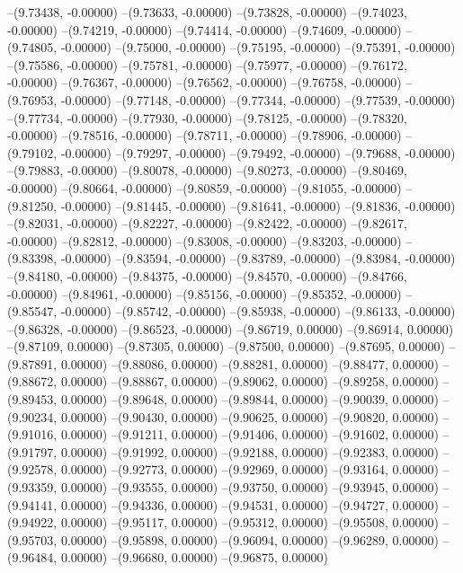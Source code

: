--(9.73438, -0.00000)
--(9.73633, -0.00000)
--(9.73828, -0.00000)
--(9.74023, -0.00000)
--(9.74219, -0.00000)
--(9.74414, -0.00000)
--(9.74609, -0.00000)
--(9.74805, -0.00000)
--(9.75000, -0.00000)
--(9.75195, -0.00000)
--(9.75391, -0.00000)
--(9.75586, -0.00000)
--(9.75781, -0.00000)
--(9.75977, -0.00000)
--(9.76172, -0.00000)
--(9.76367, -0.00000)
--(9.76562, -0.00000)
--(9.76758, -0.00000)
--(9.76953, -0.00000)
--(9.77148, -0.00000)
--(9.77344, -0.00000)
--(9.77539, -0.00000)
--(9.77734, -0.00000)
--(9.77930, -0.00000)
--(9.78125, -0.00000)
--(9.78320, -0.00000)
--(9.78516, -0.00000)
--(9.78711, -0.00000)
--(9.78906, -0.00000)
--(9.79102, -0.00000)
--(9.79297, -0.00000)
--(9.79492, -0.00000)
--(9.79688, -0.00000)
--(9.79883, -0.00000)
--(9.80078, -0.00000)
--(9.80273, -0.00000)
--(9.80469, -0.00000)
--(9.80664, -0.00000)
--(9.80859, -0.00000)
--(9.81055, -0.00000)
--(9.81250, -0.00000)
--(9.81445, -0.00000)
--(9.81641, -0.00000)
--(9.81836, -0.00000)
--(9.82031, -0.00000)
--(9.82227, -0.00000)
--(9.82422, -0.00000)
--(9.82617, -0.00000)
--(9.82812, -0.00000)
--(9.83008, -0.00000)
--(9.83203, -0.00000)
--(9.83398, -0.00000)
--(9.83594, -0.00000)
--(9.83789, -0.00000)
--(9.83984, -0.00000)
--(9.84180, -0.00000)
--(9.84375, -0.00000)
--(9.84570, -0.00000)
--(9.84766, -0.00000)
--(9.84961, -0.00000)
--(9.85156, -0.00000)
--(9.85352, -0.00000)
--(9.85547, -0.00000)
--(9.85742, -0.00000)
--(9.85938, -0.00000)
--(9.86133, -0.00000)
--(9.86328, -0.00000)
--(9.86523, -0.00000)
--(9.86719, 0.00000)
--(9.86914, 0.00000)
--(9.87109, 0.00000)
--(9.87305, 0.00000)
--(9.87500, 0.00000)
--(9.87695, 0.00000)
--(9.87891, 0.00000)
--(9.88086, 0.00000)
--(9.88281, 0.00000)
--(9.88477, 0.00000)
--(9.88672, 0.00000)
--(9.88867, 0.00000)
--(9.89062, 0.00000)
--(9.89258, 0.00000)
--(9.89453, 0.00000)
--(9.89648, 0.00000)
--(9.89844, 0.00000)
--(9.90039, 0.00000)
--(9.90234, 0.00000)
--(9.90430, 0.00000)
--(9.90625, 0.00000)
--(9.90820, 0.00000)
--(9.91016, 0.00000)
--(9.91211, 0.00000)
--(9.91406, 0.00000)
--(9.91602, 0.00000)
--(9.91797, 0.00000)
--(9.91992, 0.00000)
--(9.92188, 0.00000)
--(9.92383, 0.00000)
--(9.92578, 0.00000)
--(9.92773, 0.00000)
--(9.92969, 0.00000)
--(9.93164, 0.00000)
--(9.93359, 0.00000)
--(9.93555, 0.00000)
--(9.93750, 0.00000)
--(9.93945, 0.00000)
--(9.94141, 0.00000)
--(9.94336, 0.00000)
--(9.94531, 0.00000)
--(9.94727, 0.00000)
--(9.94922, 0.00000)
--(9.95117, 0.00000)
--(9.95312, 0.00000)
--(9.95508, 0.00000)
--(9.95703, 0.00000)
--(9.95898, 0.00000)
--(9.96094, 0.00000)
--(9.96289, 0.00000)
--(9.96484, 0.00000)
--(9.96680, 0.00000)
--(9.96875, 0.00000)
